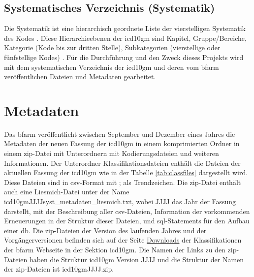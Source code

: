 \subsection{Systematisches Verzeichnis (Systematik)} 

Die Systematik ist eine hierarchisch geordnete Liste der vierstelligen Systematik des Kodes \cite{icd10syst}. Diese Hierarchieebenen der \ac{icd10gm} sind Kapitel, Gruppe/Bereiche, Kategorie (Kode bis zur dritten Stelle), Subkategorien (vierstellige oder fünfstellige Kodes) \cite{icd10systauf}. Für die Durchführung und den Zweck dieses Projekts wird mit dem systematischen Verzeichnis der \ac{icd10gm} und deren vom \ac{bfarm} veröffentlichen Dateien und Metadaten gearbeitet.

\section{Metadaten}

Das \ac{bfarm} veröffentlicht zwischen September und Dezember eines Jahres die Metadaten der neuen Fassung der \ac{icd10gm} in einem komprimierten Ordner in einem \ac{zip}-Datei mit Unterordnern  mit Kodierungsdateien und weiteren Informationen. Der Unterordner Klassifikationsdateien enthält die Dateien der aktuellen Fassung der \ac{icd10gm} wie in der Tabelle \ref{tab:classfiles} dargestellt wird. Diese Dateien sind in \ac{csv}-Format mit \glqq ;\grqq{} als Trendzeichen. Die \ac{zip}-Datei enthält auch eine Liesmich-Datei unter der Name \textsf{icd10gmJJJJsyst\_metadaten\_liesmich.txt}, wobei \textsf{JJJJ} das Jahr der Fassung darstellt, mit der Beschreibung aller \ac{csv}-Dateien, Information der vorkommenden Erneuerungen in der Struktur dieser Dateien, und \ac{sql}-Statements für den Aufbau einer \ac{db}. Die \ac{zip}-Dateien der Version des laufenden Jahres und der Vorgängerversionen befinden sich auf der Seite \href{https://www.dimdi.de/dynamic/de/klassifikationen/downloads/}{Downloads} der Klassifikationen der \ac{bfarm} Webseite in der Sektion \ac{icd10gm}. Die Namen der Links zu den \ac{zip}-Dateien haben die Struktur \textsf{\ac{icd10gm} Version JJJJ} und die Struktur der Namen der \ac{zip}-Dateien ist \textsf{\ac{icd10gm}JJJJ.zip}.

